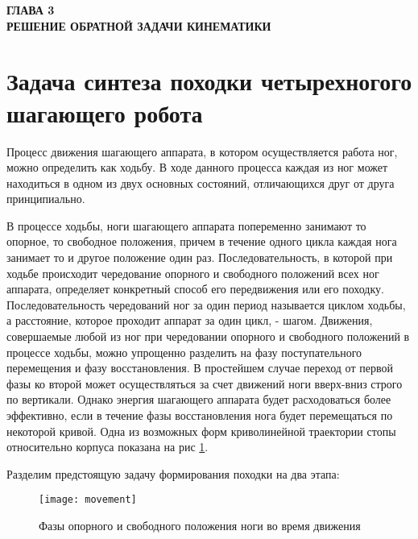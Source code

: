 
\begin{center}
	\textbf{\large ГЛАВА 3 \\ РЕШЕНИЕ ОБРАТНОЙ ЗАДАЧИ КИНЕМАТИКИ}
\end{center}


\section{Задача синтеза походки четырехногого шагающего робота}\label{C3_1}
Процесс движения шагающего аппарата, в котором осуществляется работа ног, можно определить как ходьбу. В ходе данного процесса каждая из ног может находиться в одном из двух основных состояний, отличающихся друг от друга принципиально.

В процессе ходьбы, ноги шагающего аппарата попеременно занимают то опорное, то свободное положения, причем в течение одного цикла каждая нога занимает то и другое положение один раз. Последовательность, в которой при ходьбе происходит чередование опорного и свободного положений всех ног аппарата, определяет конкретный способ его передвижения или его походку. Последовательность чередований ног за один период называется циклом ходьбы, а расстояние, которое проходит аппарат за один цикл, - шагом.
Движения, совершаемые любой из ног при чередовании опорного и свободного положений в процессе ходьбы, можно упрощенно разделить на фазу поступательного перемещения и фазу восстановления. В простейшем случае переход от первой фазы ко второй может осуществляться за счет движений ноги вверх-вниз строго по вертикали. Однако энергия шагающего аппарата будет расходоваться более эффективно, если в течение фазы восстановления нога будет перемещаться по некоторой кривой. Одна из возможных форм криволинейной траектории стопы относительно корпуса показана на рис \ref{movement}. 

Разделим предстоящую задачу формирования походки на два этапа:


\begin{figure}[h!]
	\begin{center}
		\texttt{[image: movement]}
		\caption{Фазы опорного и свободного положения ноги во время движения}
		\label{movement}
	\end{center}
\end{figure}


